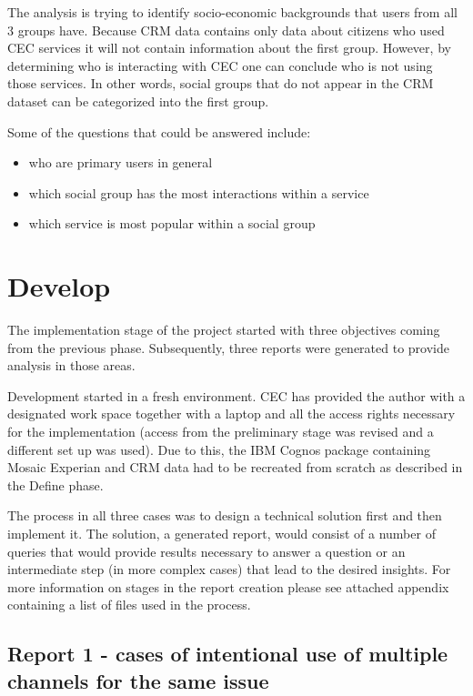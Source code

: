 The analysis is trying to identify socio-economic backgrounds that users from all 3 groups have. Because CRM data contains only data about citizens who used CEC services it will not contain information about the first group. However, by determining who is interacting with CEC one can conclude who is not using those services. In other words, social groups that do not appear in the CRM dataset can be categorized into the first group.

Some of the questions that could be answered include:
\begin{itemize}
\item who are primary users in general
\item which social group has the most interactions within a service
\item which service is most popular within a social group
\end{itemize}

	\section{Develop}
	
The implementation stage of the project started with three objectives coming from the previous phase. Subsequently, three reports were generated to provide analysis in those areas.

Development started in a fresh environment. CEC has provided the author with a designated work space together with a laptop and all the access rights necessary for the implementation (access from the preliminary stage was revised and a different set up was used). Due to this, the IBM Cognos package containing Mosaic Experian and CRM data had to be recreated from scratch as described in the Define phase.

The process in all three cases was to design a technical solution first and then implement it. The solution, a generated report, would consist of a number of queries that would provide results necessary to answer a question or an intermediate step (in more complex cases) that lead to the desired insights. For more information on stages in the report creation please see attached appendix containing a list of files used in the process.
	
		\subsection{Report 1 - cases of intentional use of multiple channels for the same issue}
		
